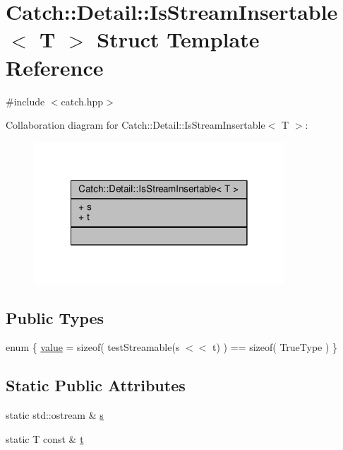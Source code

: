 \hypertarget{struct_catch_1_1_detail_1_1_is_stream_insertable}{\section{Catch\-:\-:Detail\-:\-:Is\-Stream\-Insertable$<$ T $>$ Struct Template Reference}
\label{struct_catch_1_1_detail_1_1_is_stream_insertable}
}


{\ttfamily \#include $<$catch.\-hpp$>$}



Collaboration diagram for Catch\-:\-:Detail\-:\-:Is\-Stream\-Insertable$<$ T $>$\-:
\nopagebreak
\begin{figure}[H]
\begin{center}
\leavevmode
\includegraphics[width=266pt]{struct_catch_1_1_detail_1_1_is_stream_insertable__coll__graph}
\end{center}
\end{figure}
\subsection*{Public Types}
\begin{DoxyCompactItemize}
\item 
enum \{ \hyperlink{struct_catch_1_1_detail_1_1_is_stream_insertable_a2e4508694da3bf368ff67733a7970edda765a324929702bfce2969fc19fc4f926}{value} = sizeof( test\-Streamable(s $<$$<$ t) ) == sizeof( True\-Type )
 \}
\end{DoxyCompactItemize}
\subsection*{Static Public Attributes}
\begin{DoxyCompactItemize}
\item 
static std\-::ostream \& \hyperlink{struct_catch_1_1_detail_1_1_is_stream_insertable_abe3d3c8e5d85665747faafffc9a96b00}{s}
\item 
static T const \& \hyperlink{struct_catch_1_1_detail_1_1_is_stream_insertable_a7d2a3da978b6736667a7b2f6d51f507f}{t}
\end{DoxyCompactItemize}


